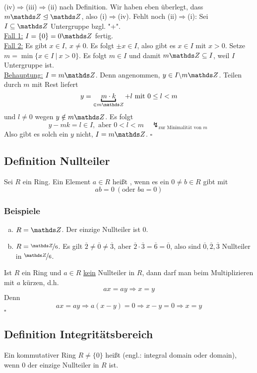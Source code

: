\\
(iv)$\Rightarrow$(iii)$\Rightarrow$(ii) nach Definition.
Wir haben eben überlegt, dass $m\Z\trianglelefteq \Z$, also (i)$\Rightarrow$(iv).
Fehlt noch (ii)$\Rightarrow$(i): Sei $I\subseteq \Z$ Untergruppe bzgl. "+".\\

\uline{Fall 1:} $I=\{0\}=0\Z$ fertig.\\
\uline{Fall 2:} Es gibt $x\in I,~x\neq 0$. 
Es folgt $\pm x\in I$, also gibt es $x\in I$ mit $x>0$. 
Setze $m=\min\{x\in I~|~x>0\}$.
Es folgt $m\in I$ und damit $m\Z\subseteq I$, weil $I$ Untergruppe ist.\\
\uline{Behauptung:} $I=m\Z$. 
Denn angenommen, $y\in I\backslash m\Z$. 
Teilen durch $m$ mit Rest liefert
\[
y=\underbracket{m\cdot k}_{\in m\Z}+l \text{ mit } 0\le l < m
\]
und $l\neq 0$ wegen $y\notin m\Z$.
Es folgt
\[
y-mk=l\in I,\text{ aber } 0<l<m\quad \lightning_{\text{zur Minimalität von }m}
\]
Also gibt es solch ein $y$ nicht, $I=m\Z$.
\hfill $\square$

\subsection{Definition Nullteiler}
\label{sub:def_nullteiler}
Sei $R$ ein Ring. 
Ein Element $a\in R$ heißt , wenn es ein $0\neq b\in R$ gibt mit 
\[
ab=0 ~(\text{oder }ba=0)
\]
\subsubsection*{Beispiele}
\begin{enumerate}[(a)]
	\item $R=\Z$. 
	Der einzige Nullteiler ist 0.
	\item $R=\nicefrac{\Z}{6}$.
	Es gilt $\overline{2}\neq \overline{0} \neq \overline{3}$, aber $\overline{2}\cdot \overline{3}=\overline{6}=\overline{0}$, also sind $\overline{0},\overline{2},\overline{3}$ Nullteiler in $\nicefrac{\Z}{6}$.
\end{enumerate}
Ist $R$ ein Ring und $a\in R$ \uline{kein} Nullteiler in $R$, dann darf man beim Multiplizieren mit $a$ kürzen, d.h.
\[
ax=ay\Rightarrow x=y
\]
Denn
\[
ax=ay\Rightarrow a(x-y)=0 \Rightarrow x-y=0\Rightarrow x=y
\]
\hfill $\square$


\subsection{Definition Integritätsbereich}
\label{sub:def_integritaetsbereich}
Ein kommutativer Ring $R\neq \{0\}$ heißt  (engl.: integral domain oder domain), wenn 0 der einzige Nullteiler in $R$ ist.

